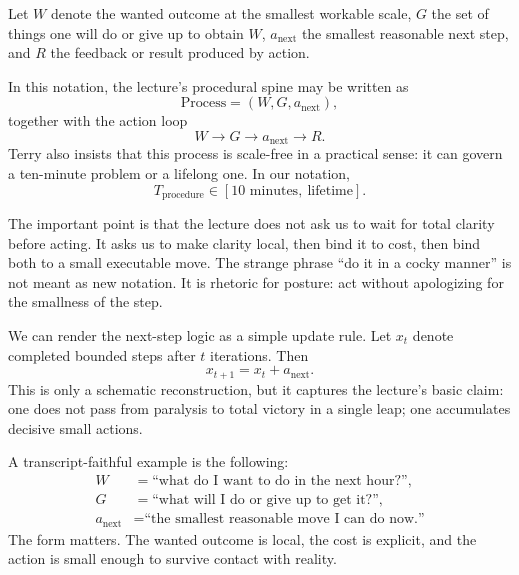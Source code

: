 \begin{definition}
Let \(W\) denote the wanted outcome at the smallest workable scale, \(G\) the set of things one will do or give up to obtain \(W\), \(a_{\text{next}}\) the smallest reasonable next step, and \(R\) the feedback or result produced by action.
\end{definition}

In this notation, the lecture's procedural spine may be written as
\begin{equation}
\text{Process} = (W,G,a_{\text{next}}),
\end{equation}
together with the action loop
\begin{equation}
W \rightarrow G \rightarrow a_{\text{next}} \rightarrow R.
\end{equation}
Terry also insists that this process is scale-free in a practical sense: it can govern a ten-minute problem or a lifelong one. In our notation,
\begin{equation}
T_{\text{procedure}} \in [10\text{ minutes},\ \text{lifetime}].
\end{equation}

The important point is that the lecture does not ask us to wait for total clarity before acting. It asks us to make clarity local, then bind it to cost, then bind both to a small executable move. The strange phrase ``do it in a cocky manner'' is not meant as new notation. It is rhetoric for posture: act without apologizing for the smallness of the step.

We can render the next-step logic as a simple update rule. Let \(x_t\) denote completed bounded steps after \(t\) iterations. Then
\begin{equation}
x_{t+1} = x_t + a_{\text{next}}.
\end{equation}
This is only a schematic reconstruction, but it captures the lecture's basic claim: one does not pass from paralysis to total victory in a single leap; one accumulates decisive small actions.

A transcript-faithful example is the following:
\begin{align}
W &= \text{``what do I want to do in the next hour?''},\\
G &= \text{``what will I do or give up to get it?''},\\
a_{\text{next}} &= \text{``the smallest reasonable move I can do now.''}
\end{align}
The form matters. The wanted outcome is local, the cost is explicit, and the action is small enough to survive contact with reality.

